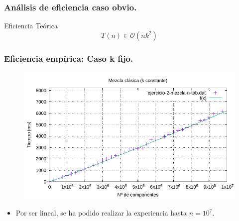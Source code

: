 \documentclass[13pt]{beamer}
\begin{document}
    \begin{frame}
		\frametitle{Análisis de eficiencia caso obvio.}
		 
		 \begin{block}{Eficiencia Teórica}
		 	$$T(n) \in \mathcal{O}(nk^{2})$$
	    \end{block}
	 
	\end{frame}


    \begin{frame}
        \frametitle{Eficiencia empírica: Caso k fijo.}

        \begin{figure}
            \centering
            \includegraphics[scale=0.76]{img/e2a-graph.pdf}
            \label{fig:2a-obvio-n-graph}
        \end{figure}

        \begin{itemize}
            \item Por ser lineal, se ha podido realizar la experiencia hasta $n=10^7$. 
        \end{itemize}
    \end{frame}
\end{document}
